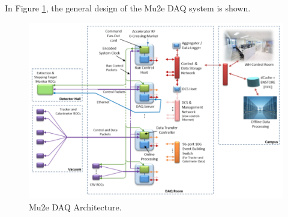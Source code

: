 In Figure \ref{fig:linktodaq}, the general design of the Mu2e DAQ system is shown.
\begin{figure}[!h]
\centering
\includegraphics[width =\textwidth]{images/chapter2/Screenshot_20240206_144803.png}
\caption{Mu2e DAQ Architecture.}
\label{fig:linktodaq}
\end{figure}
